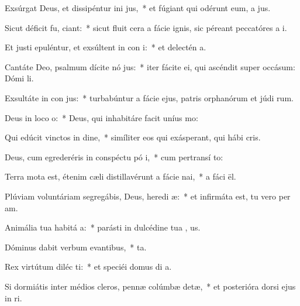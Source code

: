 \item Exsúrgat Deus, et dissipéntur ini jus,~* et fúgiant qui odérunt eum, a  jus.
\item Sicut déficit fu, ciant:~* sicut fluit cera a fácie ignis, sic péreant peccatóres a  i.
\item Et justi epuléntur, et exsúltent in con i:~* et delectén  a.
\item Cantáte Deo, psalmum dícite nó jus:~* iter fácite ei, qui ascéndit super occásum: Dómi  li.
\item Exsultáte in con jus:~* turbabúntur a fácie ejus, patris orphanórum et júdi rum.
\item Deus in loco  o:~* Deus, qui inhabitáre facit uníus   mo:
\item Qui edúcit vinctos in dine,~* simíliter eos qui exásperant, qui hábi  cris.
\item Deus, cum egrederéris in conspéctu pó i,~* cum pertransí  to:
\item Terra mota est, étenim cæli distillavérunt a fácie  nai,~* a fáci  ël.
\item Plúviam voluntáriam segregábis, Deus, heredi æ:~* et infirmáta est, tu vero per am.
\item Animália tua habitá  a:~* parásti in dulcédine tua , us.
\item Dóminus dabit verbum evantibus,~*  ta.
\item Rex virtútum diléc ti:~* et speciéi domus di a.
\item Si dormiátis inter médios cleros, pennæ colúmbæ detæ,~* et posterióra dorsi ejus in  ri.
